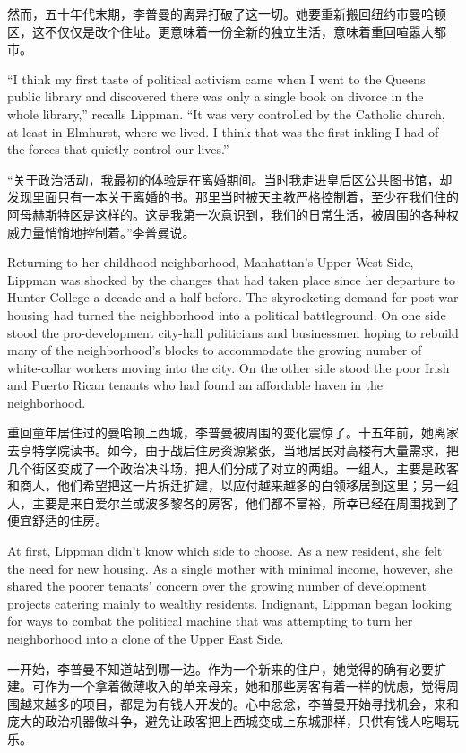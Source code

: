 \ifdefined\chs
然而，五十年代末期，李普曼的离异打破了这一切。她要重新搬回纽约市曼哈顿区，这不仅仅是改个住址。更意味着一份全新的独立生活，意味着重回喧嚣大都市。
\fi

\ifdefined\eng
``I think my first taste of political activism came when I went to the Queens public library and discovered there was only a single book on divorce in the whole library,'' recalls Lippman. ``It was very controlled by the Catholic church, at least in Elmhurst, where we lived. I think that was the first inkling I had of the forces that quietly control our lives.''
\fi

\ifdefined\chs
“关于政治活动，我最初的体验是在离婚期间。当时我走进皇后区公共图书馆，却发现里面只有一本关于离婚的书。那里当时被天主教严格控制着，至少在我们住的阿母赫斯特区是这样的。这是我第一次意识到，我们的日常生活，被周围的各种权威力量悄悄地控制着。”李普曼说。
\fi

\ifdefined\eng
Returning to her childhood neighborhood, Manhattan's Upper West Side, Lippman was shocked by the changes that had taken place since her departure to Hunter College a decade and a half before. The skyrocketing demand for post-war housing had turned the neighborhood into a political battleground. On one side stood the pro-development city-hall politicians and businessmen hoping to rebuild many of the neighborhood's blocks to accommodate the growing number of white-collar workers moving into the city. On the other side stood the poor Irish and Puerto Rican tenants who had found an affordable haven in the neighborhood.
\fi

\ifdefined\chs
重回童年居住过的曼哈顿上西城，李普曼被周围的变化震惊了。十五年前，她离家去亨特学院读书。如今，由于战后住房资源紧张，当地居民对高楼有大量需求，把几个街区变成了一个政治决斗场，把人们分成了对立的两组。一组人，主要是政客和商人，他们希望把这一片拆迁扩建，以应付越来越多的白领移居到这里；另一组人，主要是来自爱尔兰或波多黎各的房客，他们都不富裕，所幸已经在周围找到了便宜舒适的住房。
\fi

\ifdefined\eng
At first, Lippman didn't know which side to choose. As a new resident, she felt the need for new housing. As a single mother with minimal income, however, she shared the poorer tenants' concern over the growing number of development projects catering mainly to wealthy residents. Indignant, Lippman began looking for ways to combat the political machine that was attempting to turn her neighborhood into a clone of the Upper East Side.
\fi

\ifdefined\chs
一开始，李普曼不知道站到哪一边。作为一个新来的住户，她觉得的确有必要扩建。可作为一个拿着微薄收入的单亲母亲，她和那些房客有着一样的忧虑，觉得周围越来越多的项目，都是为有钱人开发的。心中忿忿，李普曼开始寻找机会，来和庞大的政治机器做斗争，避免让政客把上西城变成上东城那样，只供有钱人吃喝玩乐。
\fi

